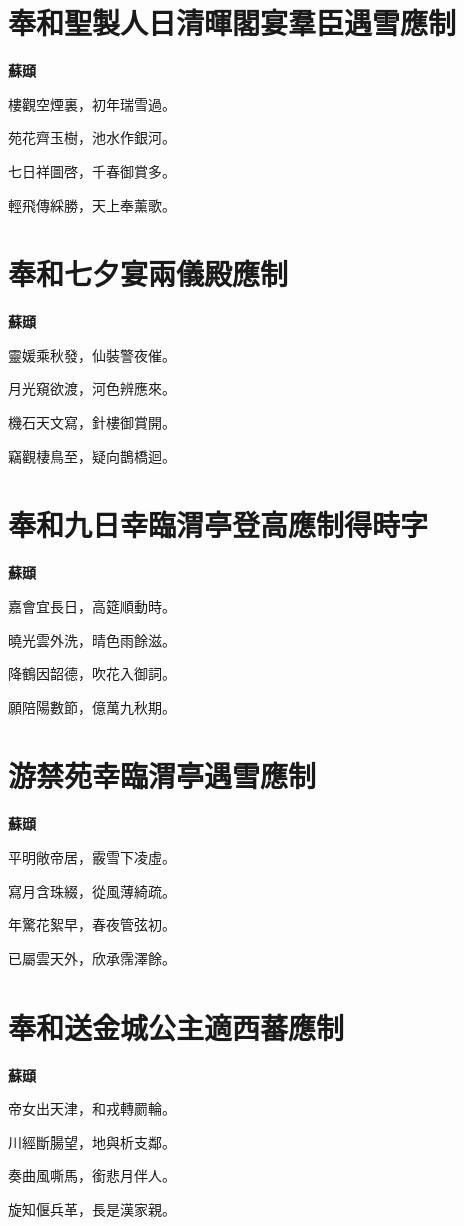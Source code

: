 \documentclass[12pt,a4paper]{ctexbook}
\begin{document}
\section{奉和聖製人日清暉閣宴羣臣遇雪應制}
\textbf{蘇頲}\par\vspace{0.5em}
樓觀空煙裏，初年瑞雪過。\par
苑花齊玉樹，池水作銀河。\par
七日祥圖啓，千春御賞多。\par
輕飛傳綵勝，天上奉薰歌。\par

\section{奉和七夕宴兩儀殿應制}
\textbf{蘇頲}\par\vspace{0.5em}
靈媛乘秋發，仙裝警夜催。\par
月光窺欲渡，河色辨應來。\par
機石天文寫，針樓御賞開。\par
竊觀棲鳥至，疑向鵲橋迴。\par

\section{奉和九日幸臨渭亭登高應制得時字}
\textbf{蘇頲}\par\vspace{0.5em}
嘉會宜長日，高筵順動時。\par
曉光雲外洗，晴色雨餘滋。\par
降鶴因韶德，吹花入御詞。\par
願陪陽數節，億萬九秋期。\par

\section{游禁苑幸臨渭亭遇雪應制}
\textbf{蘇頲}\par\vspace{0.5em}
平明敞帝居，霰雪下凌虛。\par
寫月含珠綴，從風薄綺疏。\par
年驚花絮早，春夜管弦初。\par
已屬雲天外，欣承霈澤餘。\par

\section{奉和送金城公主適西蕃應制}
\textbf{蘇頲}\par\vspace{0.5em}
帝女出天津，和戎轉罽輪。\par
川經斷腸望，地與析支鄰。\par
奏曲風嘶馬，銜悲月伴人。\par
旋知偃兵革，長是漢家親。\par
\end{document}
